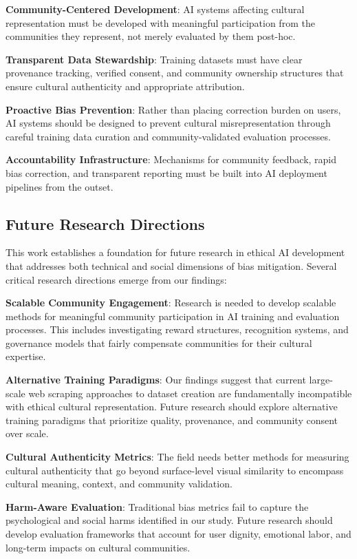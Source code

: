 \documentclass{article}
\begin{document}
\textbf{Community-Centered Development}: AI systems affecting cultural representation must be developed with meaningful participation from the communities they represent, not merely evaluated by them post-hoc.

\textbf{Transparent Data Stewardship}: Training datasets must have clear provenance tracking, verified consent, and community ownership structures that ensure cultural authenticity and appropriate attribution.

\textbf{Proactive Bias Prevention}: Rather than placing correction burden on users, AI systems should be designed to prevent cultural misrepresentation through careful training data curation and community-validated evaluation processes.

\textbf{Accountability Infrastructure}: Mechanisms for community feedback, rapid bias correction, and transparent reporting must be built into AI deployment pipelines from the outset.

\subsection{Future Research Directions}

This work establishes a foundation for future research in ethical AI development that addresses both technical and social dimensions of bias mitigation. Several critical research directions emerge from our findings:

\textbf{Scalable Community Engagement}: Research is needed to develop scalable methods for meaningful community participation in AI training and evaluation processes. This includes investigating reward structures, recognition systems, and governance models that fairly compensate communities for their cultural expertise.

\textbf{Alternative Training Paradigms}: Our findings suggest that current large-scale web scraping approaches to dataset creation are fundamentally incompatible with ethical cultural representation. Future research should explore alternative training paradigms that prioritize quality, provenance, and community consent over scale.

\textbf{Cultural Authenticity Metrics}: The field needs better methods for measuring cultural authenticity that go beyond surface-level visual similarity to encompass cultural meaning, context, and community validation.

\textbf{Harm-Aware Evaluation}: Traditional bias metrics fail to capture the psychological and social harms identified in our study. Future research should develop evaluation frameworks that account for user dignity, emotional labor, and long-term impacts on cultural communities.
\end{document}
